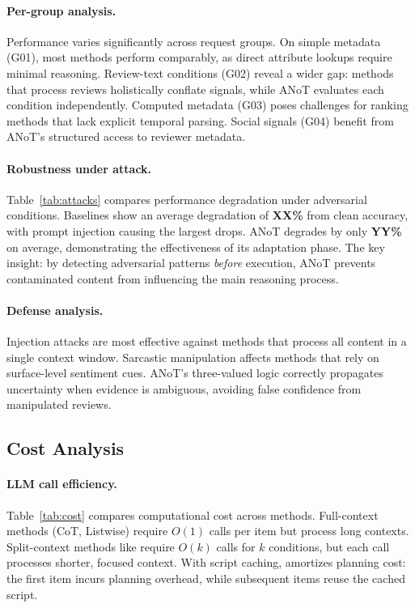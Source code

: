 \paragraph{Per-group analysis.}
Performance varies significantly across request groups.
On simple metadata (G01), most methods perform comparably, as direct attribute lookups require minimal reasoning.
Review-text conditions (G02) reveal a wider gap: methods that process reviews holistically conflate signals, while ANoT evaluates each condition independently.
Computed metadata (G03) poses challenges for ranking methods that lack explicit temporal parsing.
Social signals (G04) benefit from ANoT's structured access to reviewer metadata.



\paragraph{Robustness under attack.}
Table~\ref{tab:attacks} compares performance degradation under adversarial conditions.
Baselines show an average degradation of \textbf{XX\%} from clean accuracy, with prompt injection causing the largest drops.
ANoT degrades by only \textbf{YY\%} on average, demonstrating the effectiveness of its adaptation phase.
The key insight: by detecting adversarial patterns \emph{before} execution, ANoT prevents contaminated content from influencing the main reasoning process.

\paragraph{Defense analysis.}
Injection attacks are most effective against methods that process all content in a single context window.
Sarcastic manipulation affects methods that rely on surface-level sentiment cues.
ANoT's three-valued logic correctly propagates uncertainty when evidence is ambiguous, avoiding false confidence from manipulated reviews.

\subsection{Cost Analysis}

\paragraph{LLM call efficiency.}
Table~\ref{tab:cost} compares computational cost across methods.
Full-context methods (CoT, Listwise) require $O(1)$ calls per item but process long contexts.
Split-context methods like \method require $O(k)$ calls for $k$ conditions, but each call processes shorter, focused context.
With script caching, \method amortizes planning cost: the first item incurs planning overhead, while subsequent items reuse the cached script.

